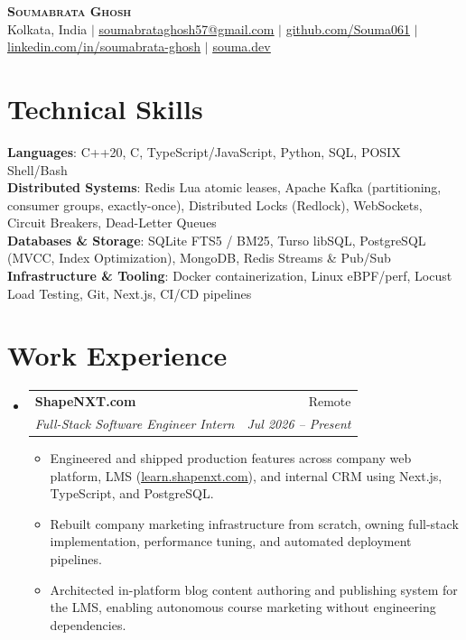 \documentclass[letterpaper,10pt]{article}
\makeatletter
\newcommand{\resumeItem}[1]{
  \item\small{
    {#1 \vspace{-2pt}}
  }
}
\newcommand{\resumeSubheading}[4]{
  \vspace{-2pt}\item
    \begin{tabular*}{0.97\textwidth}[t]{l@{\extracolsep{\fill}}r}
      \textbf{#1} & #2 \\
      \textit{\small#3} & \textit{\small #4} \\
    \end{tabular*}\vspace{-7pt}
}
\newcommand{\resumeSubHeadingListStart}{\begin{itemize}[leftmargin=0.15in, label={}]}
\newcommand{\resumeSubHeadingListEnd}{\end{itemize}}
\newcommand{\resumeItemListStart}{\begin{itemize}}
\newcommand{\resumeItemListEnd}{\end{itemize}\vspace{-5pt}}
\makeatother
\begin{document}
\begin{center}
    \textbf{\Huge \scshape Soumabrata Ghosh} \\ \vspace{2pt}
    \small Kolkata, India $|$ 
    \href{mailto:soumabrataghosh57@gmail.com}{\underline{soumabrataghosh57@gmail.com}} $|$ 
    \href{https://github.com/Souma061}{\underline{github.com/Souma061}} $|$ 
    \href{https://linkedin.com/in/soumabrata-ghosh}{\underline{linkedin.com/in/soumabrata-ghosh}} $|$ 
    \href{https://souma.dev}{\underline{souma.dev}}
\end{center}

\section{Technical Skills}
 \begin{itemize}[leftmargin=0.15in, label={}]
    \small{\item{
     \textbf{Languages}{: C++20, C, TypeScript/JavaScript, Python, SQL, POSIX Shell/Bash} \\
     \textbf{Distributed Systems}{: Redis Lua atomic leases, Apache Kafka (partitioning, consumer groups, exactly-once), Distributed Locks (Redlock), WebSockets, Circuit Breakers, Dead-Letter Queues} \\
     \textbf{Databases \& Storage}{: SQLite FTS5 / BM25, Turso libSQL, PostgreSQL (MVCC, Index Optimization), MongoDB, Redis Streams \& Pub/Sub} \\
     \textbf{Infrastructure \& Tooling}{: Docker containerization, Linux eBPF/perf, Locust Load Testing, Git, Next.js, CI/CD pipelines}
    }}
 \end{itemize}

\section{Work Experience}
  \resumeSubHeadingListStart
    \resumeSubheading
      {ShapeNXT.com}{Remote}
      {Full-Stack Software Engineer Intern}{Jul 2026 -- Present}
      \resumeItemListStart
        \resumeItem{Engineered and shipped production features across company web platform, LMS (\href{https://learn.shapenxt.com}{\underline{learn.shapenxt.com}}), and internal CRM using Next.js, TypeScript, and PostgreSQL.}
        \resumeItem{Rebuilt company marketing infrastructure from scratch, owning full-stack implementation, performance tuning, and automated deployment pipelines.}
        \resumeItem{Architected in-platform blog content authoring and publishing system for the LMS, enabling autonomous course marketing without engineering dependencies.}
      \resumeItemListEnd
  \resumeSubHeadingListEnd
\end{document}
